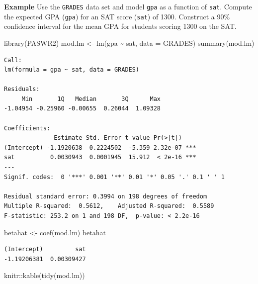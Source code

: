 \documentclass[
]{article}
\newenvironment{Shaded}{\begin{snugshade}}{\end{snugshade}}
\newcommand{\AttributeTok}[1]{\textcolor[rgb]{0.77,0.63,0.00}{#1}}
\newcommand{\FunctionTok}[1]{\textcolor[rgb]{0.00,0.00,0.00}{#1}}
\newcommand{\NormalTok}[1]{#1}
\newcommand{\OtherTok}[1]{\textcolor[rgb]{0.56,0.35,0.01}{#1}}
\newcommand{\SpecialCharTok}[1]{\textcolor[rgb]{0.00,0.00,0.00}{#1}}
\begin{document}
\textbf{Example} Use the \texttt{GRADES} data set and model \texttt{gpa} as a function of \texttt{sat}. Compute the expected GPA (\texttt{gpa}) for an SAT score (\texttt{sat}) of 1300. Construct a 90\% confidence interval for the mean GPA for students scoring 1300 on the SAT.

\begin{Shaded}
\begin{Highlighting}[]
\FunctionTok{library}\NormalTok{(PASWR2)}
\NormalTok{mod.lm }\OtherTok{\textless{}{-}} \FunctionTok{lm}\NormalTok{(gpa }\SpecialCharTok{\textasciitilde{}}\NormalTok{ sat, }\AttributeTok{data =}\NormalTok{ GRADES)}
\FunctionTok{summary}\NormalTok{(mod.lm)}
\end{Highlighting}
\end{Shaded}

\begin{verbatim}
Call:
lm(formula = gpa ~ sat, data = GRADES)

Residuals:
     Min       1Q   Median       3Q      Max 
-1.04954 -0.25960 -0.00655  0.26044  1.09328 

Coefficients:
              Estimate Std. Error t value Pr(>|t|)    
(Intercept) -1.1920638  0.2224502  -5.359 2.32e-07 ***
sat          0.0030943  0.0001945  15.912  < 2e-16 ***
---
Signif. codes:  0 '***' 0.001 '**' 0.01 '*' 0.05 '.' 0.1 ' ' 1

Residual standard error: 0.3994 on 198 degrees of freedom
Multiple R-squared:  0.5612,    Adjusted R-squared:  0.5589 
F-statistic: 253.2 on 1 and 198 DF,  p-value: < 2.2e-16
\end{verbatim}

\begin{Shaded}
\begin{Highlighting}[]
\NormalTok{betahat }\OtherTok{\textless{}{-}} \FunctionTok{coef}\NormalTok{(mod.lm)}
\NormalTok{betahat}
\end{Highlighting}
\end{Shaded}

\begin{verbatim}
(Intercept)         sat 
-1.19206381  0.00309427 
\end{verbatim}

\begin{Shaded}
\begin{Highlighting}[]
\NormalTok{knitr}\SpecialCharTok{::}\FunctionTok{kable}\NormalTok{(}\FunctionTok{tidy}\NormalTok{(mod.lm))}
\end{Highlighting}
\end{Shaded}
\end{document}

